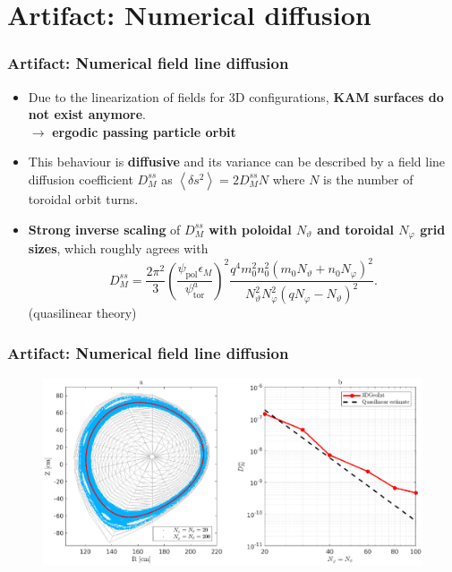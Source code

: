 \documentclass{beamer}
\newcommand{\be}[1]{\begin{equation} \label{#1}}
\newcommand{\ee}{\end{equation}}
\begin{document}
\section{Artifact: Numerical diffusion}

\begin{frame}
\frametitle{Artifact: Numerical field line diffusion}
\vspace{-0.5cm}
\begin{itemize}
\item
Due to the linearization of fields for 3D configurations, \textbf{KAM surfaces do not exist anymore}. \\
$\rightarrow$ \textbf{ergodic passing particle orbit}
\item This behaviour is\textbf{ diffusive} and its
variance can be described by a field line diffusion coefficient $D_M^{ss}$ as
$\left\langle \delta s^2\right\rangle=2 D_M^{ss} N$ where $N$ is the number of toroidal orbit turns.
\item \textbf{Strong inverse scaling} of \textbf{$D_M^{ss}$ with poloidal $N_\vartheta$ and toroidal $N_\varphi$ grid sizes}, which roughly agrees with 
\be{quasilinear_diffco}
D^{ss}_M = \frac{2 \pi^2}{3} \left( \frac{\psi_{\text{pol}} \epsilon_M }{\psi_{\text{tor}}^a}\right)^2 \frac{q^4 m_0^2 n_0^2 
	\left(m_0 N_\vartheta + n_0 N_\varphi \right)^2}{N_\vartheta^2 N_\varphi^2 \left( q N_\varphi-N_\vartheta\right)^2}.
\ee
\vspace{-1cm}
\tiny{(quasilinear theory)}
\vspace{1cm}
\end{itemize}
\end{frame}


\begin{frame}
\frametitle{Artifact: Numerical field line diffusion}
\vspace{-1.4cm}
\begin{figure}
\hspace*{-1.4cm}\includegraphics[width=1.25\textwidth]{FIGURES/diffusion.eps}
\end{figure}
\end{frame}
\end{document}
